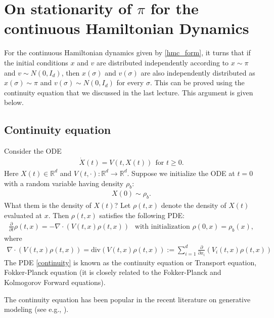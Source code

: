 \documentclass{scrartcl}
\newcommand{\R}{{\mathbb R}}
\begin{document}
\section{On stationarity of $\pi$ for the continuous Hamiltonian
  Dynamics}

For the continuous Hamiltonian dynamics given by \eqref{hmc_form}, it
turns that if the initial conditions $x$ and $v$ are distributed
independently according to $x \sim \pi$ and $v \sim N(0, I_d)$, then
$x(\sigma)$ and $v(\sigma)$ are also independently distributed as $x(\sigma)
\sim \pi$ and $v(\sigma) \sim N(0, I_d)$ for every $\sigma$. This can
be proved using the continuity equation that we discussed in the last
lecture. This argument is given below.

\subsection{Continuity equation}

Consider the ODE
\begin{align}\label{gen_ode}
  \dot{X}(t) = V(t, X(t)) ~~\text{for $t \geq 0$}. 
\end{align}
Here $X(t) \in \R^d$ and $V(t, \cdot) : \R^d \rightarrow
\R^d$. Suppose we initialize the ODE at $t = 0$ with a random variable
having density $\rho_b$:
\begin{align*}
  X(0) \sim \rho_b. 
\end{align*}
What them is the density of $X(t)$? Let $\rho(t, x)$ denote the
density of $X(t)$ evaluated at $x$. Then $\rho(t, x)$ satisfies the
following PDE:
\begin{align}\label{continuity}
  \frac{\partial}{\partial t} \rho(t, x) = -\nabla \cdot \left(V(t, x)
  \rho(t, x)
  \right) ~~ \text{ with initialization } \rho(0, x) = \rho_b(x), 
\end{align}
where
\begin{align*}
  \nabla \cdot \left(V(t, x) \rho(t, x) \right) = \text{div}(V(t, x)
  \rho(t, x)) := \sum_{i=1}^d \frac{\partial}{\partial x_i} \left(V_i(t, x)
  \rho(t, x) \right)
\end{align*}
The PDE \eqref{continuity} is known as the continuity equation or
Transport equation, Fokker-Planck equation (it is closely related to
the Fokker-Planck and Kolmogorov Forward equations).

The continuity equation has been popular in the recent literature on
generative modeling (see e.g., \citet[Equation (5.2.8), Theorem 5.2.2,
Section B.1.2]{lai2025principles}).
\end{document}
